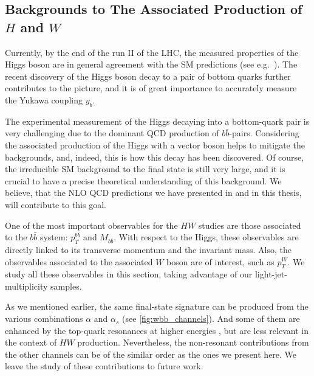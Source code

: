 

\subsection{Backgrounds to The Associated Production of \texorpdfstring{$H$}{H} and \texorpdfstring{$W$}{W}}
\label{sec:hw}

Currently, by the end of the run II of the LHC,
the measured properties of the Higgs boson are
in general agreement with the SM predictions (see e.g.\ \cite{Khachatryan:2016vau}).
The recent discovery of the Higgs boson decay to a pair of bottom quarks \cite{Sirunyan:2018kst,Aaboud:2018zhk}
further contributes to the picture, 
and it is of great importance to accurately measure the Yukawa coupling $y_b$.

The experimental measurement of the Higgs decaying into a bottom-quark pair
is very challenging due to the dominant QCD production of $b\bar{b}$-pairs.
Considering the associated production of the Higgs with a vector boson 
helps to mitigate the backgrounds, and, indeed, this is how this decay has been discovered.
Of course, the irreducible SM background to the \Wbb{} final state is still very large,
and it is crucial to have a precise theoretical understanding of this background. 
We believe, that the NLO QCD predictions we have presented in \cite{Anger:2017glm} and
in this thesis, will contribute to this goal.

One of the most important observables for the $HW$ studies are those associated to the $b\bar
b$ system: $p_T^{b\bar b}$ and $M_{b\bar b}$.
With respect to the Higgs, these observables are directly linked to its transverse momentum and the invariant mass. 
Also, the observables associated to the associated $W$ boson are of interest, such as $p_T^W$.
We study all these observables in this section, taking advantage of our light-jet-multiplicity samples.

As we mentioned earlier, the same final-state signature can
be produced from the various combinations $\alpha$ and $\alpha_s$ (see \cref{fig:wbb_channels}). 
And some of them are enhanced by the top-quark resonances at higher energies \cite{Denner:2017kzu},
but are less relevant in the context of $HW$ production.
Nevertheless, the non-resonant contributions from the other channels can be of the similar order
as the ones we present here. We leave the study of these contributions to future work.

